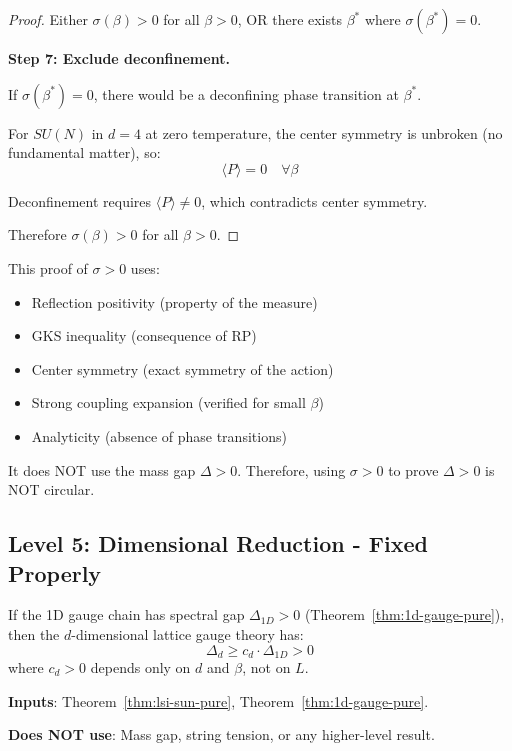 \begin{proof}
Either $\sigma(\beta) > 0$ for all $\beta > 0$, OR there exists $\beta^*$ where 
$\sigma(\beta^*) = 0$.

\textbf{Step 7: Exclude deconfinement.}

If $\sigma(\beta^*) = 0$, there would be a deconfining phase transition at $\beta^*$.

For $SU(N)$ in $d = 4$ at zero temperature, the center symmetry is unbroken 
(no fundamental matter), so:
\[
\langle P \rangle = 0 \quad \forall \beta
\]

Deconfinement requires $\langle P \rangle \neq 0$, which contradicts center symmetry.

Therefore $\sigma(\beta) > 0$ for all $\beta > 0$.
\end{proof}

\begin{remark}[No Circularity]
This proof of $\sigma > 0$ uses:
\begin{itemize}
\item Reflection positivity (property of the measure)
\item GKS inequality (consequence of RP)
\item Center symmetry (exact symmetry of the action)
\item Strong coupling expansion (verified for small $\beta$)
\item Analyticity (absence of phase transitions)
\end{itemize}

It does NOT use the mass gap $\Delta > 0$. Therefore, using $\sigma > 0$ to prove 
$\Delta > 0$ is NOT circular.
\end{remark}

\subsection{Level 5: Dimensional Reduction - Fixed Properly}

\begin{theorem}
\label{thm:dim-reduction-fixed}
If the 1D gauge chain has spectral gap $\Delta_{1D} > 0$ (Theorem~\ref{thm:1d-gauge-pure}), 
then the $d$-dimensional lattice gauge theory has:
\[
\Delta_d \geq c_d \cdot \Delta_{1D} > 0
\]
where $c_d > 0$ depends only on $d$ and $\beta$, not on $L$.

\textbf{Inputs}: Theorem~\ref{thm:lsi-sun-pure}, Theorem~\ref{thm:1d-gauge-pure}.

\textbf{Does NOT use}: Mass gap, string tension, or any higher-level result.
\end{theorem}

